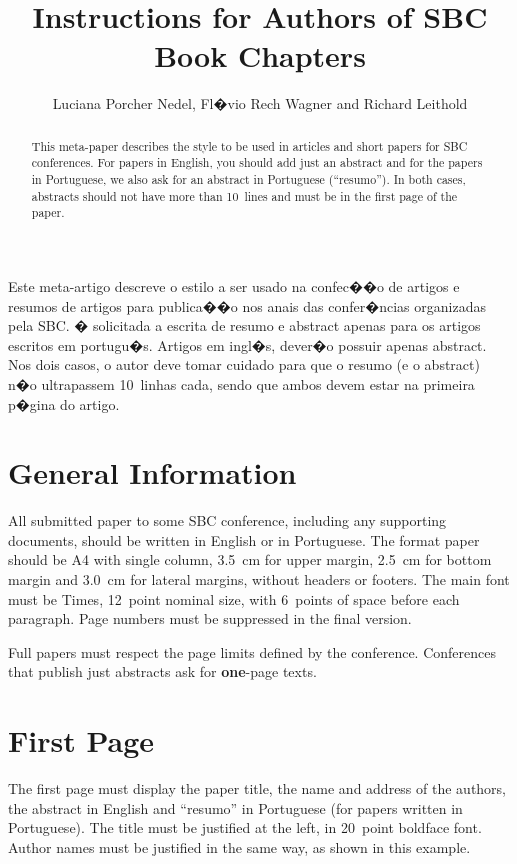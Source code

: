 \documentclass{SBCbookchapter}
\author{Luciana Porcher Nedel, Fl�vio Rech Wagner and Richard Leithold}
\title{Instructions for Authors of SBC Book Chapters}
\begin{document}
\maketitle

\begin{abstract}
This meta-paper describes the style to be used in articles and short
papers for SBC conferences. For papers in English, you should add just
an abstract and for the papers in Portuguese, we also ask for an
abstract in Portuguese (``resumo''). In both cases, abstracts should not
have more than 10~lines and must be in the first page of the paper.
\end{abstract}

\begin{resumo}
\begin{otherlanguage}{brazilian}
Este meta-artigo descreve o estilo a ser usado na confec��o de artigos
e resumos de artigos para publica��o nos anais das confer�ncias
organizadas pela SBC. � solicitada a escrita de resumo e abstract apenas
para os artigos escritos em portugu�s. Artigos em ingl�s, dever�o
possuir apenas abstract. Nos dois casos, o autor deve tomar cuidado para
que o resumo (e o abstract) n�o ultrapassem 10~linhas cada, sendo que
ambos devem estar na primeira p�gina do artigo.
\end{otherlanguage}
\end{resumo}

\section{General Information}
All submitted paper to some SBC conference, including any supporting
documents, should be written in English or in Portuguese. The format
paper should be A4 with single column, 3.5~cm for upper margin, 2.5~cm
for bottom margin and 3.0~cm for lateral margins, without headers or
footers. The main font must be Times, 12~point nominal size, with
6~points of space before each paragraph. Page numbers must be
suppressed in the final version.

Full papers must respect the page limits defined by the conference.
Conferences that publish just abstracts ask for \textbf{one}-page
texts.

\section{First Page}
The first page must display the paper title, the name and address of
the authors, the abstract in English and ``resumo'' in Portuguese (for
papers written in Portuguese). The title must be justified at the
left, in 20~point boldface font. Author names must be justified in the
same way, as shown in this example.
\end{document}
